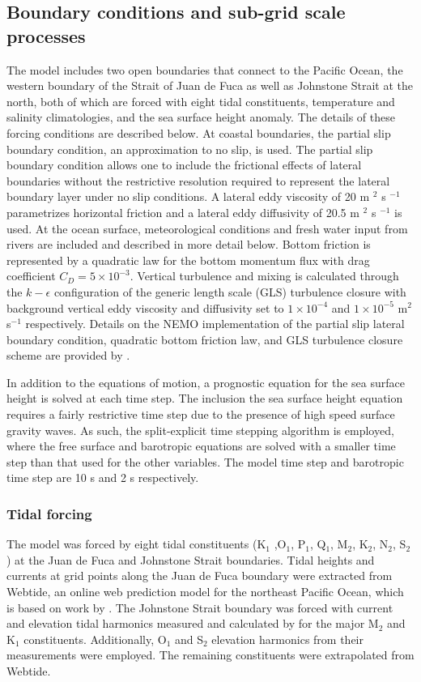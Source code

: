 \documentclass[pdftex,10pt]{article}
\begin{document}
\subsection{Boundary conditions and sub-grid scale processes}
The model includes two open boundaries that connect to the Pacific Ocean, the western boundary of the Strait of Juan de Fuca as well as Johnstone Strait at the north, both of which are forced with eight tidal constituents, temperature and salinity climatologies, and the sea surface height anomaly. The details of these forcing conditions are described below. At coastal boundaries, the partial slip boundary condition, an approximation to no slip, is used. The partial slip boundary condition allows one to include the frictional effects of lateral boundaries without the restrictive resolution required to represent the lateral boundary layer under no slip conditions. A lateral eddy viscosity of 20 m $^2$ s $^{-1}$ parametrizes horizontal friction and a lateral eddy diffusivity of 20.5 m $^2$ s $^{-1}$ is used. At the ocean surface, meteorological conditions and fresh water input from rivers are included and described in more detail below. Bottom friction is represented by a quadratic law for the bottom momentum flux with drag coefficient $C_D = 5\times 10^{-3}$. Vertical turbulence and mixing is calculated through the $k-\epsilon$ configuration of the generic length scale (GLS) turbulence closure \citep{umlauf2003generic} with background vertical eddy viscosity and diffusivity set to $1\times10^{-4}$ and $1\times10^{-5}$ m$^2$ s$^{-1}$ respectively. Details on the NEMO implementation of the partial slip lateral boundary condition, quadratic bottom friction law, and GLS turbulence closure scheme are provided by \citet{madec2012nemo}.

In addition to the equations of motion, a prognostic equation for the sea surface height is solved at each time step. The inclusion the sea surface height equation requires a fairly restrictive time step due to the presence of high speed surface gravity waves. As such, the split-explicit time stepping algorithm is employed, where the free surface and barotropic equations are solved with a smaller time step than that used for the other variables. The model time step and barotropic time step are 10 s and 2 s respectively. 


\subsubsection{Tidal forcing} 
The model was forced by eight tidal constituents (K$_1$ ,O$_1$, P$_1$, Q$_1$, M$_2$, K$_2$, N$_2$, S$_2$) at the Juan de Fuca and Johnstone Strait boundaries. Tidal heights and currents at grid points along the Juan de Fuca boundary were extracted from Webtide, an online web prediction model for the northeast Pacific Ocean, which is based on work by \citet{foreman2000webtide}. The Johnstone Strait boundary was forced with current and elevation tidal harmonics measured and calculated by \citet{thomson1980johnstone} for the major M$_2$ and K$_1$ constituents. Additionally, O$_1$ and S$_2$ elevation harmonics from their measurements were employed. The remaining constituents were extrapolated from Webtide. 
\end{document}
